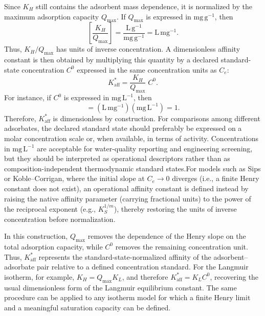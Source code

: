 \documentclass[journal=jacsat,manuscript=article]{achemso}
\begin{document}
Since $K_H$ still contains the adsorbent mass dependence, it is normalized by the maximum adsorption capacity $Q_{\max}$. If $Q_{\max}$ is expressed in $\mathrm{mg\,g^{-1}}$, then
\begin{equation}
	\left[\frac{K_H}{Q_{\max}}\right]
	=
	\frac{\mathrm{L\,g^{-1}}}{\mathrm{mg\,g^{-1}}}
	=
	\mathrm{L\,mg^{-1}}.
	\label{eq:Kaff_units}
\end{equation}
Thus, $K_H/Q_{\max}$ has units of inverse concentration. A dimensionless affinity constant is then obtained by multiplying this quantity by a declared standard-state concentration $C^0$ expressed in the same concentration units as $C_e$:
\begin{equation}
	K_{\mathrm{aff}}^{\ast}
	= \frac{K_H}{Q_{\max}}\; C^{0}.
	\label{eq:Kaff_star}
\end{equation}
For instance, if $C^0$ is expressed in $\mathrm{mg\,L^{-1}}$, then
\begin{equation}
	[K_{\mathrm{aff}}^{\ast}]
	=
	\left(\mathrm{L\,mg^{-1}}\right)
	\left(\mathrm{mg\,L^{-1}}\right)
	=
	1.
	\label{eq:Kaff_dimensionless}
\end{equation}
Therefore, $K_{\mathrm{aff}}^{\ast}$ is dimensionless by construction.
For comparisons among different adsorbates, the declared standard state should preferably be expressed on a molar concentration scale or, when available, in terms of activity. Concentrations in \(\mathrm{mg\,L^{-1}}\) are acceptable for water-quality reporting and engineering screening, but they should be interpreted as operational descriptors rather than as composition-independent thermodynamic standard states.For models such as Sips or Koble--Corrigan, where the initial slope at $C_e \to 0$ diverges (i.e., a finite Henry constant does not exist), an operational affinity constant is defined instead by raising the native affinity parameter (carrying fractional units) to the power of the reciprocal exponent (e.g., $K_S^{1/m}$), thereby restoring the units of inverse concentration before normalization.

In this construction, $Q_{\max}$ removes the dependence of the Henry slope on the total adsorption capacity, while $C^0$ removes the remaining concentration unit. Thus, $K_{\mathrm{aff}}^{\ast}$ represents the standard-state-normalized affinity of the adsorbent--adsorbate pair relative to a defined concentration standard. For the Langmuir isotherm, for example, $K_H = Q_{\max} K_L$, and therefore $K_{\mathrm{aff}}^{\ast}=K_L C^{0}$, recovering the usual dimensionless form of the Langmuir equilibrium constant. The same procedure can be applied to any isotherm model for which a finite Henry limit and a meaningful saturation capacity can be defined.
\end{document}
